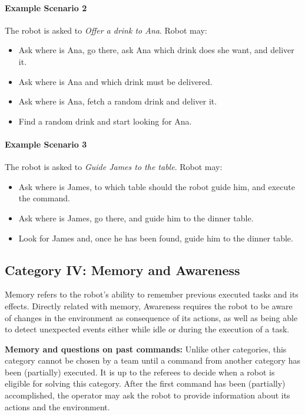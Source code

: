\paragraph{Example Scenario 2}
The robot is asked to \textit{Offer a drink to Ana}. Robot may:
\begin{itemize}
	\item Ask where is Ana, go there, ask Ana which drink does she want, and deliver it.
	\item Ask where is Ana and which drink must be delivered.
	\item Ask where is Ana, fetch a random drink and deliver it.
	\item Find a random drink and start looking for Ana.
\end{itemize}

\paragraph{Example Scenario 3}
The robot is asked to \textit{Guide James to the table}. Robot may:
\begin{itemize}
	\item Ask where is James, to which table should the robot guide him, and execute the command.
	\item Ask where is James, go there, and guide him to the dinner table.
	\item Look for James and, once he has been found, guide him to the dinner table.
\end{itemize}


%
%
\subsection{Category IV: Memory and Awareness}
\label{sec:eegpsr-categoryIV-explained}
Memory refers to the robot's ability to remember previous executed tasks and its effects. Directly related with memory, Awareness requires the robot to be aware of changes in the environment as consequence of its actions, as well as being able to detect unexpected events either while idle or during the execution of a task.

\textbf{Memory and questions on past commands:} Unlike other categories, this category cannot be chosen by a team until a command from another category has been (partially) executed. It is up to the referees to decide when a robot is eligible for solving this category. After the first command has been (partially) accomplished, the operator may ask the robot to provide information about its actions and the environment.


